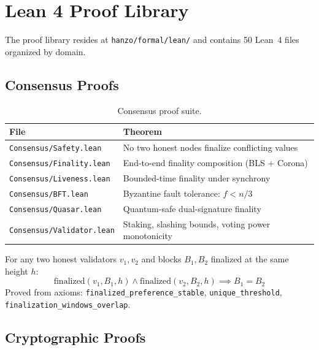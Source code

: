 \documentclass[11pt,letterpaper]{article}
\begin{document}
\section{Lean 4 Proof Library}

The proof library resides at \texttt{hanzo/formal/lean/} and contains 50 Lean~4 files organized by domain.

\subsection{Consensus Proofs}

\begin{table}[H]
\centering
\small
\begin{tabular}{@{}lp{6.5cm}@{}}
\toprule
\textbf{File} & \textbf{Theorem} \\
\midrule
\texttt{Consensus/Safety.lean} & No two honest nodes finalize conflicting values \\
\texttt{Consensus/Finality.lean} & End-to-end finality composition (BLS + Corona) \\
\texttt{Consensus/Liveness.lean} & Bounded-time finality under synchrony \\
\texttt{Consensus/BFT.lean} & Byzantine fault tolerance: $f < n/3$ \\
\texttt{Consensus/Quasar.lean} & Quantum-safe dual-signature finality \\
\texttt{Consensus/Validator.lean} & Staking, slashing bounds, voting power monotonicity \\
\bottomrule
\end{tabular}
\caption{Consensus proof suite.}
\label{tab:consensus-proofs}
\end{table}

\begin{theorem}
For any two honest validators $v_1, v_2$ and blocks $B_1, B_2$ finalized at the same height $h$:
\[
\text{finalized}(v_1, B_1, h) \wedge \text{finalized}(v_2, B_2, h) \implies B_1 = B_2
\]
Proved from axioms: \texttt{finalized\_preference\_stable}, \texttt{unique\_threshold}, \texttt{finalization\_windows\_overlap}.
\end{theorem}

\subsection{Cryptographic Proofs}
\end{document}

